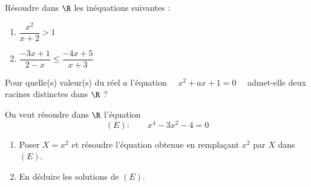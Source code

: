 \documentclass[a4paper,11pt,exos]{nsi} %
\begin{document}
\exo{}
Résoudre dans $\R$ les inéquations suivantes :
\begin{multicols}{2}	
	\begin{enumerate}
		\item 	$\dfrac{x^2}{x+2}>1$
		\item 	$\dfrac{-3x+1}{2-x}\leqslant\dfrac{-4x+5}{x+3}$
	\end{enumerate}
\end{multicols}



\exo{}
Pour quelle(s) valeur(s) du réel $a$ l'équation $\quad x^2+ax+1=0 \quad$  admet-elle deux racines distinctes dans $\R$ ?

On veut résoudre dans $\R$ l'équation  $$(E):\qquad x^4-3x^2-4=0$$
\begin{enumerate}
	\item 	Poser $X=x^2$ et résoudre l'équation obtenue en remplaçant $x^2$ par $X$ dans $(E)$.
	\item 	En déduire les solutions de $(E)$.
\end{enumerate}
\end{document}
